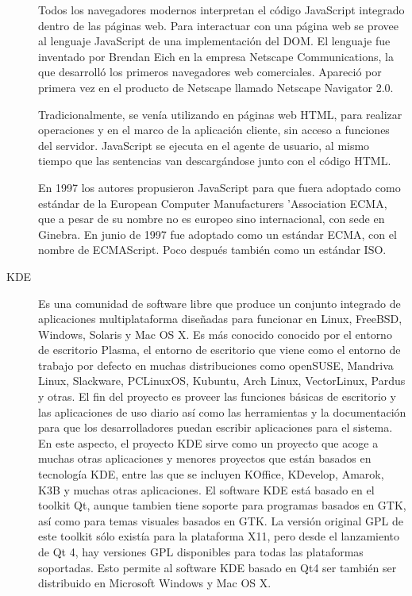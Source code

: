 \begin{description}
Todos los navegadores modernos interpretan el código JavaScript integrado dentro de las páginas web. Para interactuar con una página web se provee al lenguaje JavaScript de una implementación del DOM. El lenguaje fue inventado por Brendan Eich en la empresa Netscape Communications, la que desarrolló los primeros navegadores web comerciales. Apareció por primera vez en el producto de Netscape llamado Netscape Navigator 2.0.

Tradicionalmente, se venía utilizando en páginas web HTML, para realizar operaciones y en el marco de la aplicación cliente, sin acceso a funciones del servidor. JavaScript se ejecuta en el agente de usuario, al mismo tiempo que las sentencias van descargándose junto con el código HTML.

En 1997 los autores propusieron JavaScript para que fuera adoptado como estándar de la European Computer Manufacturers 'Association ECMA, que a pesar de su nombre no es europeo sino internacional, con sede en Ginebra. En junio de 1997 fue adoptado como un estándar ECMA, con el nombre de ECMAScript. Poco después también como un estándar ISO.

\item[KDE]
Es una comunidad de software libre que produce un conjunto integrado de aplicaciones multiplataforma diseñadas para funcionar en Linux, FreeBSD, Windows, Solaris y Mac OS X. Es más conocido conocido por el entorno de escritorio Plasma, el entorno de escritorio que viene como el entorno de trabajo por defecto en muchas distribuciones como openSUSE, Mandriva Linux, Slackware, PCLinuxOS, Kubuntu, Arch Linux, VectorLinux, Pardus y otras. El fin del proyecto es proveer las funciones básicas de escritorio y las aplicaciones de uso diario así como las herramientas y la documentación para que los desarrolladores puedan escribir aplicaciones para el sistema. En este aspecto, el proyecto KDE sirve como un proyecto que acoge a muchas otras aplicaciones y menores proyectos que están basados en tecnología KDE, entre las que se incluyen KOffice, KDevelop, Amarok, K3B y muchas otras aplicaciones. El software KDE está basado en el toolkit Qt, aunque tambien tiene soporte para programas basados en GTK, así como para temas visuales basados en GTK. La versión original GPL de este toolkit sólo existía para la plataforma X11, pero desde el lanzamiento de Qt 4, hay versiones GPL disponibles para todas las plataformas soportadas. Esto permite al software KDE basado en Qt4 ser también ser distribuido en Microsoft Windows y Mac OS X.


\end{description}
